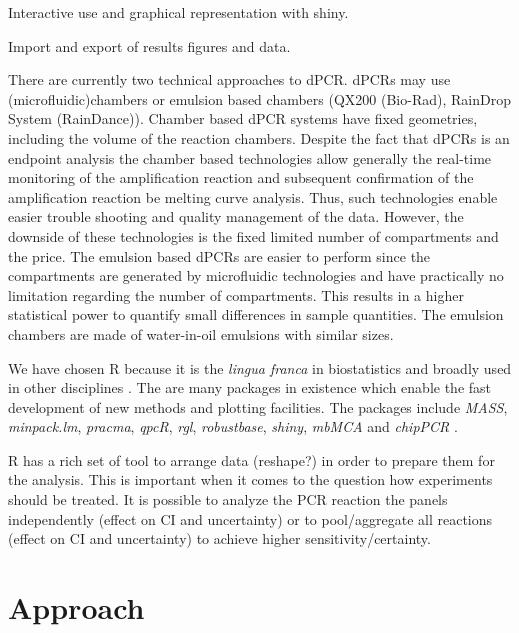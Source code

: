 \documentclass{bioinfo}
\begin{document}
Interactive use and graphical representation with shiny.

Import and export of results figures and data.

There are currently two technical approaches to dPCR. dPCRs may use		%
(microfluidic)chambers or emulsion based chambers 
(QX200 \texttrademark (Bio-Rad), RainDrop \texttrademark System (RainDance)). 
Chamber based dPCR systems have fixed geometries, including the volume of the 
reaction chambers. Despite the fact that dPCRs is an endpoint analysis the 
chamber based technologies allow generally the real-time monitoring of the 
amplification reaction and subsequent confirmation of the amplification reaction 
be melting curve analysis. Thus, such technologies enable easier trouble 
shooting and quality management of the data. However, the downside of these 
technologies is the fixed limited number of compartments and the price. The 
emulsion based dPCRs are easier to perform since the compartments are generated 
by microfluidic technologies and have practically no limitation regarding the 
number of compartments. This results in a higher statistical power to quantify 
small differences in sample quantities. The emulsion chambers are made of 
water-in-oil emulsions with similar sizes.

We have chosen R because it is the \textit{lingua franca} in biostatistics and broadly 
used in other disciplines \cite{rodiger_r_2015}. The are many packages in existence which enable the 
fast development of new methods and plotting facilities. The packages include 
\textit{MASS}, \textit{minpack.lm}, \textit{pracma}, \textit{qpcR}, \textit{rgl}, \textit{robustbase}, \textit{shiny}, \textit{mbMCA} \cite{rodiger_surface_2013} and \textit{chipPCR} \cite{rodiger_chippcr_2015}.

R has a rich set of tool to arrange data (reshape?) in order to prepare them for 
the analysis. This is important when it comes to the question how experiments 
should be treated. It is possible to analyze the PCR reaction the panels 
independently (effect on CI and uncertainty) or to pool/aggregate all reactions 
(effect on CI and uncertainty) to achieve higher sensitivity/certainty.

\section{Approach}
\end{document}
